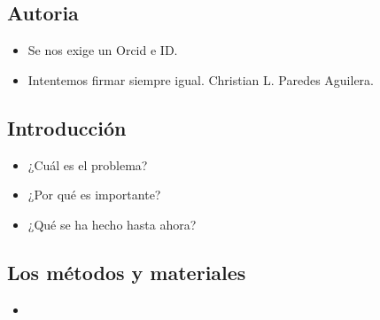 \subsection{Autoria}
\begin{itemize}
    \item Se nos exige un Orcid e ID.
    \item Intentemos firmar siempre igual. Christian L. Paredes Aguilera.
\end{itemize}

\subsection{Introducción}
\begin{itemize}
    \item ¿Cuál es el problema?
    \item ¿Por qué es importante?
    \item ¿Qué se ha hecho hasta ahora?
\end{itemize}

\subsection{Los métodos y materiales}
\begin{itemize}
    \item 
\end{itemize}
